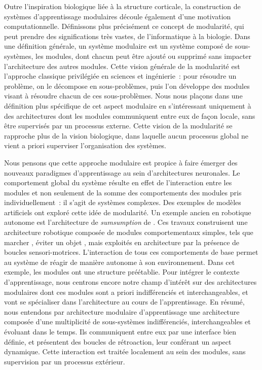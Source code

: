Outre l'inspiration biologique liée à la structure corticale, la construction de systèmes d'apprentissage modulaires découle également d'une motivation computationnelle.
Définissons plus précisément ce concept de modularité, qui peut prendre des significations très vastes, de l'informatique à la biologie. 
Dans une définition générale, un système modulaire est un système composé de sous-systèmes, les modules, dont chacun peut être ajouté ou supprimé sans impacter l'architecture des autres modules.
Cette vision générale de la modularité est l'approche classique privilégiée en sciences et ingénierie~: pour résoudre un problème, on le décompose en sous-problèmes, puis l'on développe des modules visant à résoudre chacun de ces sous-problèmes.
Nous nous plaçons dans une définition plus spécifique de cet aspect modulaire en s'intéressant uniquement à des architectures dont les modules communiquent entre eux de façon locale, sans être supervisés par un processus externe.
Cette vision de la modularité se rapproche plus de la vision biologique, dans laquelle aucun processus global ne vient a priori superviser l'organisation des systèmes. 


Nous pensons que cette approche modulaire est propice à faire émerger des nouveaux paradigmes d'apprentissage au sein d'architectures neuronales. 
Le comportement global du système résulte en effet de l'interaction entre les modules et non seulement de la somme des comportements des modules pris individuellement~: il s'agit de systèmes complexes. 
Des exemples de modèles artificiels ont exploré cette idée de modularité. Un exemple ancien en robotique autonome est l'architecture de \emph{sumsumption} de \cite{brooks_sumsumption_85}. Ces travaux construisent une architecture robotique composée de modules comportementaux simples, tels que \og marcher \fg{}, \og éviter un objet \fg{}, mais exploités en architecture par la présence de boucles sensori-motrices. L'interaction de tous ces comportements de base permet au système de réagir de manière autonome à son environnement. 
Dans cet exemple, les modules ont une structure préétablie.
Pour intégrer le contexte d'apprentissage, nous centrons encore notre champ d'intérêt sur des architectures modulaires dont ces modules sont a priori indifférenciés et interchangeables, et vont se spécialiser dans l'architecture au cours de l'apprentissage. 
En résumé, nous entendons par architecture modulaire d'apprentissage une architecture composée d'une multiplicité de sous-systèmes indifférenciés, interchangeables et évoluant dans le temps.
Ils communiquent entre eux par une interface bien définie, et présentent des boucles de rétroaction, leur conférant un aspect dynamique. Cette interaction est traitée localement au sein des modules, sans supervision par un processus extérieur.

